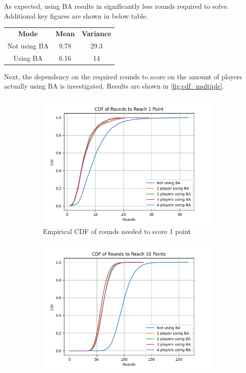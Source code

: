 \documentclass{article}
\begin{document}
As expected, using BA results in significantly less rounds required to solve. Additional key figures are shown in below table.

\begin{center}
\begin{tabular}{c|cc}
\centering
\textbf{Mode} & \textbf{Mean} & \textbf{Variance} \\
Not using BA & 9.78 & 29.3 \\
Using BA & 6.16 & 14
\end{tabular}
\end{center}

Next, the dependency on the required rounds to score on the amount of players actually using BA is investigated. Results are shown in \cref{fig:cdf_multiple}.

\begin{figure}[H]
    \centering
    \begin{subfigure}{0.45\textwidth}
        \centering
        \includegraphics[width=\linewidth]{cdf_rounds_to_score_1_per_playermode.png}
        \caption{Empirical CDF of rounds needed to score 1 point}
    \end{subfigure}
    \hfill
    \begin{subfigure}{0.45\textwidth}
        \centering
        \includegraphics[width=\linewidth]{cdf_rounds_to_score_10_per_playermode.png}

\end{subfigure}
\end{figure}
\end{document}
